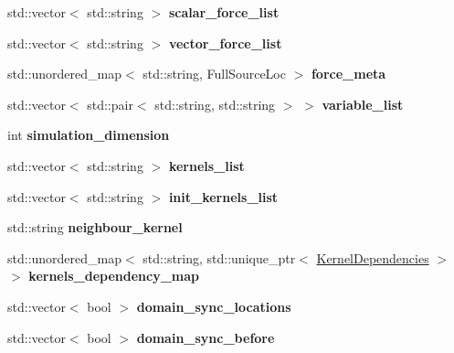\begin{DoxyCompactItemize}
\item 
\mbox{\label{structws2st_1_1WashProgramMeta_a71dfe0ec3a593707b26a3387d6ffe097}} 
std\+::vector$<$ std\+::string $>$ {\bfseries scalar\+\_\+force\+\_\+list}
\item 
\mbox{\label{structws2st_1_1WashProgramMeta_a4b2ccb325270ac70589972a556b704b5}} 
std\+::vector$<$ std\+::string $>$ {\bfseries vector\+\_\+force\+\_\+list}
\item 
\mbox{\label{structws2st_1_1WashProgramMeta_a2769172e26989f7d8759906460bbd43c}} 
std\+::unordered\+\_\+map$<$ std\+::string, Full\+Source\+Loc $>$ {\bfseries force\+\_\+meta}
\item 
\mbox{\label{structws2st_1_1WashProgramMeta_ac42b81ba6becd8cba9834dc903704e5c}} 
std\+::vector$<$ std\+::pair$<$ std\+::string, std\+::string $>$ $>$ {\bfseries variable\+\_\+list}
\item 
\mbox{\label{structws2st_1_1WashProgramMeta_a3a521dc326a6070a0af9c4bbec3913f4}} 
int {\bfseries simulation\+\_\+dimension}
\item 
\mbox{\label{structws2st_1_1WashProgramMeta_ae19b95e2db30a6d8b366b1c9965b4806}} 
std\+::vector$<$ std\+::string $>$ {\bfseries kernels\+\_\+list}
\item 
\mbox{\label{structws2st_1_1WashProgramMeta_a36d24273393b878a32f470aff4cd837f}} 
std\+::vector$<$ std\+::string $>$ {\bfseries init\+\_\+kernels\+\_\+list}
\item 
\mbox{\label{structws2st_1_1WashProgramMeta_ab8b551d40c83ad55f84610e7041972cd}} 
std\+::string {\bfseries neighbour\+\_\+kernel}
\item 
\mbox{\label{structws2st_1_1WashProgramMeta_a3f60907c890b351559afda6420edf367}} 
std\+::unordered\+\_\+map$<$ std\+::string, std\+::unique\+\_\+ptr$<$ \mbox{\hyperlink{structws2st_1_1KernelDependencies}{Kernel\+Dependencies}} $>$ $>$ {\bfseries kernels\+\_\+dependency\+\_\+map}
\item 
\mbox{\label{structws2st_1_1WashProgramMeta_aa6a9a7afafcc71c0e39e87b6af2216a1}} 
std\+::vector$<$ bool $>$ {\bfseries domain\+\_\+sync\+\_\+locations}
\item 
\mbox{\label{structws2st_1_1WashProgramMeta_a43cc6c30c364f4b03c79189998368ad4}} 
std\+::vector$<$ bool $>$ {\bfseries domain\+\_\+sync\+\_\+before}
\end{DoxyCompactItemize}


